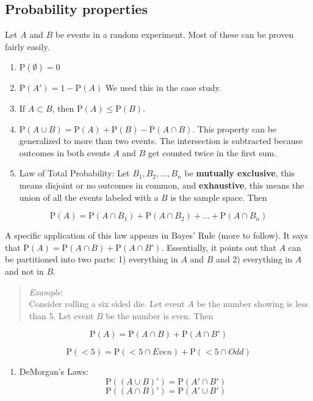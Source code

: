 \documentclass[
]{book}
\providecommand{\tightlist}{%
  \setlength{\itemsep}{0pt}\setlength{\parskip}{0pt}}
\begin{document}
\hypertarget{probability-properties}{%
\subsection{Probability properties}\label{probability-properties}}

Let \(A\) and \(B\) be events in a random experiment. Most of these can be proven fairly easily.

\begin{enumerate}
\def\labelenumi{\arabic{enumi})}
\item
  \(\mbox{P}(\emptyset)=0\)
\item
  \(\mbox{P}(A')=1-\mbox{P}(A)\) We used this in the case study.
\item
  If \(A\subset B\), then \(\mbox{P}(A)\leq \mbox{P}(B)\).
\item
  \(\mbox{P}(A\cup B) = \mbox{P}(A)+\mbox{P}(B)-\mbox{P}(A\cap B)\). This property can be generalized to more than two events. The intersection is subtracted because outcomes in both events \(A\) and \(B\) get counted twice in the first sum.
\item
  Law of Total Probability: Let \(B_1, B_2,...,B_n\) be \textbf{mutually exclusive}, this means disjoint or no outcomes in common, and \textbf{exhaustive}, this means the union of all the events labeled with a \(B\) is the sample space. Then
\end{enumerate}

\[
\mbox{P}(A)=\mbox{P}(A\cap B_1)+\mbox{P}(A\cap B_2)+...+\mbox{P}(A\cap B_n)
\]

A specific application of this law appears in Bayes' Rule (more to follow). It says that \(\mbox{P}(A)=\mbox{P}(A \cap B)+\mbox{P}(A \cap B')\). Essentially, it points out that \(A\) can be partitioned into two parts: 1) everything in \(A\) and \(B\) and 2) everything in \(A\) and not in \(B\).

\begin{quote}
\emph{Example}:\\
Consider rolling a six sided die. Let event \(A\) be the number showing is less than 5. Let event \(B\) be the number is even. Then
\end{quote}

\[\mbox{P}(A)=\mbox{P}(A \cap B) + \mbox{P}(A \cap B')\]

\[
\mbox{P}(< 5)=\mbox{P}(<5 \cap Even)+\mbox{P}(<5 \cap Odd)
\]

\begin{enumerate}
\def\labelenumi{\arabic{enumi})}
\setcounter{enumi}{5}
\tightlist
\item
  DeMorgan's Laws:
  \[
  \mbox{P}((A \cup B)')=\mbox{P}(A' \cap B')
  \]
  \[
  \mbox{P}((A \cap B)')=\mbox{P}(A' \cup B')
  \]
\end{enumerate}
\end{document}
